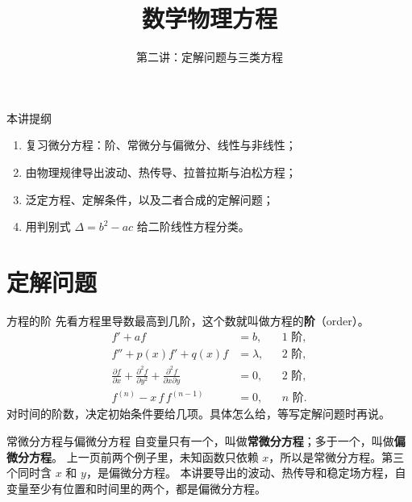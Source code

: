 \documentclass[fontset=windows, chinese, 10pt, xcolor=dvipsnames]{beamer}
\title{数学物理方程}
\subtitle{第二讲：定解问题与三类方程}
\begin{document}
\begin{frame}
  \titlepage
\end{frame}

\begin{frame}{本讲提纲}
  \begin{enumerate}
    \item 复习微分方程：阶、常微分与偏微分、线性与非线性；
    \item 由物理规律导出波动、热传导、拉普拉斯与泊松方程；
    \item 泛定方程、定解条件，以及二者合成的定解问题；
    \item 用判别式 $\Delta=b^2-ac$ 给二阶线性方程分类。
  \end{enumerate}
\end{frame}

\section{定解问题}


\begin{frame}{方程的阶}
  先看方程里导数最高到几阶，这个数就叫做方程的\textbf{阶}（order）。
  \begin{align*}
    f'+a f&=b, && \text{$1$ 阶},\\
    f''+p(x)f'+q(x)f&=\lambda, && \text{$2$ 阶},\\
    \frac{\partial f}{\partial x}
      +\frac{\partial^2 f}{\partial y^2}
      +\frac{\partial^2 f}{\partial x\partial y}&=0,
      && \text{$2$ 阶},\\
    f^{(n)}-x\,f\,f^{(n-1)}&=0, && \text{$n$ 阶}.
  \end{align*}
  对时间的阶数，决定初始条件要给几项。具体怎么给，等写定解问题时再说。
\end{frame}

\begin{frame}{常微分方程与偏微分方程}
  自变量只有一个，叫做\textbf{常微分方程}；多于一个，叫做\textbf{偏微分方程}。
  \vspace{0.4em}
  上一页前两个例子里，未知函数只依赖 $x$，所以是常微分方程。第三个同时含 $x$ 和 $y$，是偏微分方程。
  \vspace{0.35em}
  本讲要导出的波动、热传导和稳定场方程，自变量至少有位置和时间里的两个，都是偏微分方程。
\end{frame}
\end{document}
